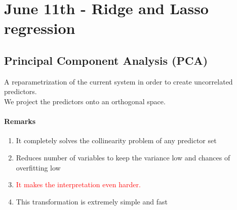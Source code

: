 \documentclass[11pt]{article}
\begin{document}
\section{June 11th - Ridge and Lasso regression}
\subsection{Principal Component Analysis (PCA)}
A reparametrization of the current system in order to create uncorrelated predictors. \\
We project the predictors onto an orthogonal space.
\paragraph{Remarks}
\begin{enumerate}
	\item It completely solves the collinearity problem of any predictor set
	\item Reduces number of variables to keep the variance low and chances of overfitting low
	\item \textcolor{red}{It makes the interpretation even harder.}
	\item This transformation is extremely simple and fast
\end{enumerate}
\end{document}
